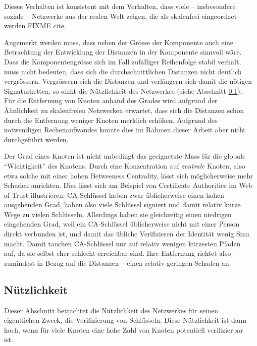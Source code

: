Dieses Verhalten ist konsistent mit dem Verhalten, dass viele --
insbesondere soziale -- Netzwerke aus der realen Welt zeigen, die als
skalenfrei eingeordnet werden FIXME cite. 

Angemerkt werden muss, dass neben der Gr\"osse der Komponente auch
eine Betrachtung der Entwicklung der Distanzen in der Komponente
sinnvoll w\"are. Dass die Komponentengr\"osse sich im Fall
zuf\"alliger Reihenfolge stabil verh\"alt, muss nicht bedeuten, dass
sich die durchschnittlichen Distanzen nicht deutlich
vergr\"ossern. Vergr\"ossern sich die Distanzen und verl\"angern sich
damit die n\"otigen Signaturketten, so sinkt die N\"utzlichkeit des
Netzwerkes (siehe Abschnitt \ref{sec:nutzlichkeit}). F\"ur die
Entfernung von Knoten anhand des Grades wird aufgrund der
\"Ahnlichkeit zu skalenfreien Netzwerken erwartet, dass sich die
Distanzen schon durch die Entfernung weniger Knoten merklich
erh\"ohen. Aufgrund des notwendigen Rechenaufwandes konnte dies im
Rahmen dieser Arbeit aber nicht durchgef\"uhrt werden.

Der Grad eines Knoten ist nicht unbedingt das geeignetste Mass f\"ur
die globale ``Wichtigkeit'' des Knotens. Durch eine Konzentration auf
\emph{zentrale} Knoten, also etwa solche mit einer hohen Betweeness
Centrality, l\"asst sich m\"oglicherweise mehr Schaden anrichten. Dies
l\"asst sich am Beispiel von Certificate Authorities im Web of Trust
illustrieren: CA-Schl\"ussel haben zwar \"ublicherweise einen hohen
ausgehenden Grad, haben also viele Schl\"ussel signiert und damit
relativ kurze Wege zu vielen Schl\"usseln. Allerdings haben sie
gleichzeitig einen niedrigen eingehenden Grad, weil ein CA-Schl\"ussel
\"ublicherweise nicht mit einer Person direkt verbunden ist, und damit
das \"ubliche Verifizieren der Identit\"at wenig Sinn macht. Damit
tauchen CA-Schl\"ussel nur auf relativ wenigen k\"urzesten Pfaden auf,
da sie selbst eher schlecht erreichbar sind. Ihre Entfernung richtet
also -- zumindest in Bezug auf die Distanzen -- einen relativ geringen
Schaden an.

\subsection{N\"utzlichkeit}
\label{sec:nutzlichkeit}
Dieser Abschnitt betrachtet die N\"utzlichkeit des Netzwerkes f\"ur
seinen eigentlichen Zweck, die Verifizierung von Schl\"usseln. Diese
N\"utzlichkeit ist dann hoch, wenn f\"ur viele Knoten eine hohe Zahl
von Knoten potentiell verifizierbar ist.

